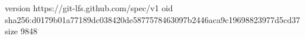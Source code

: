 version https://git-lfs.github.com/spec/v1
oid sha256:d0179b01a77189dc038420de5877578463097b2446aca9c19698823977d5cd37
size 9848
